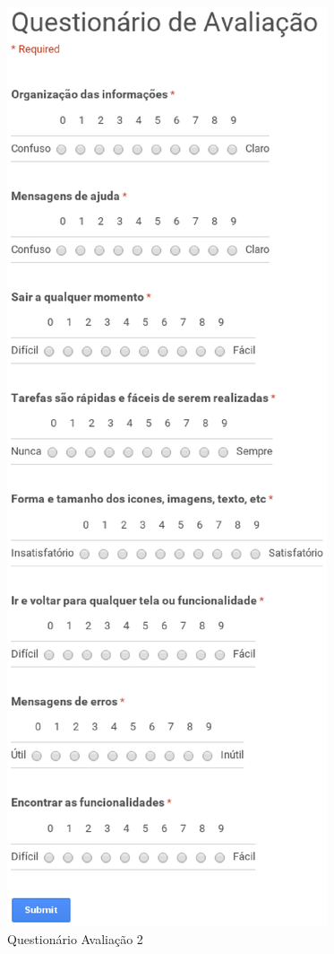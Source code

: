 \begin{apendicesenv}
\begin{figure}[h]
	\includegraphics[scale=0.5]{figuras/questionario_avaliacao2.eps}
	\caption{Questionário Avaliação 2}
\end{figure}
\begin{figure}[h]
	\centering

\end{figure}
\end{apendicesenv}
